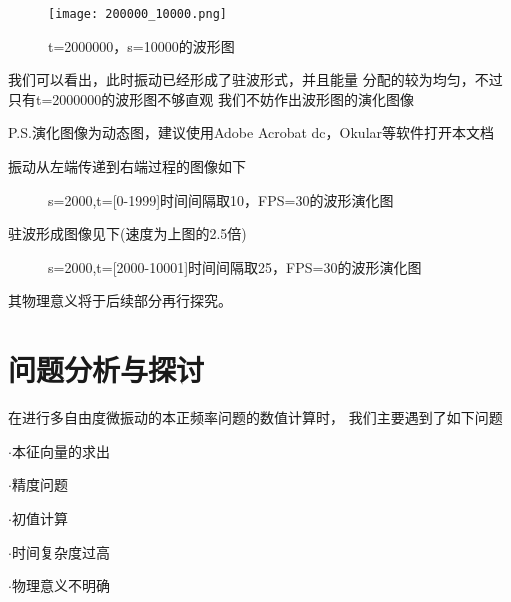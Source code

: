 \documentclass[11pt, a4paper, oneside]{ctexart}
\begin{document}
{{{\begin{figure}[H]
        
    \centering
    \vspace{2mm}
    \texttt{[image: 200000\_10000.png]}
    \caption{t=2000000，s=10000的波形图 }


\end{figure} 

\vspace{7mm}
我们可以看出，此时振动已经形成了驻波形式，并且能量
分配的较为均匀，不过只有t=2000000的波形图不够直观
我们不妨作出波形图的演化图像


\vspace{5mm}
P.S.演化图像为动态图，建议使用Adobe Acrobat dc，Okular等软件打开本文档

\newpage

振动从左端传递到右端过程的图像如下

\begin{figure}[H]
\centering
\vspace{-3mm}
    \vspace{-8mm}
    \caption{s=2000,t=[0-1999]时间间隔取10，FPS=30的波形演化图}
\end{figure} 

驻波形成图像见下(速度为上图的2.5倍)

\begin{figure}[H]
\centering
\vspace{-3mm}
\vspace{-8mm}
\caption{s=2000,t=[2000-10001]时间间隔取25，FPS=30的波形演化图}
\end{figure} 

其物理意义将于后续部分再行探究。
{
    
   
        
}

\newpage
\section{问题分析与探讨}
{
    在进行多自由度微振动的本正频率问题的数值计算时，
    我们主要遇到了如下问题

    $\cdot$本征向量的求出

    $\cdot$精度问题

    $\cdot$初值计算
    
    $\cdot$时间复杂度过高

    $\cdot$物理意义不明确
    
}}}}
\end{document}
